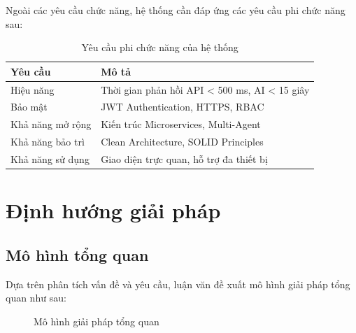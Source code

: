 \documentclass[12pt,a4paper]{report}
\begin{document}
Ngoài các yêu cầu chức năng, hệ thống cần đáp ứng các yêu cầu phi chức năng sau:

\begin{table}[H]
\centering
\caption{Yêu cầu phi chức năng của hệ thống}
\begin{tabular}{|p{5cm}|p{8cm}|}
\hline
\textbf{Yêu cầu} & \textbf{Mô tả} \\
\hline
Hiệu năng & Thời gian phản hồi API < 500 ms, AI < 15 giây \\
\hline
Bảo mật & JWT Authentication, HTTPS, RBAC \\
\hline
Khả năng mở rộng & Kiến trúc Microservices, Multi-Agent \\
\hline
Khả năng bảo trì & Clean Architecture, SOLID Principles \\
\hline
Khả năng sử dụng & Giao diện trực quan, hỗ trợ đa thiết bị \\
\hline
\end{tabular}
\label{tab:non_functional_requirements}
\end{table}

\section{Định hướng giải pháp}

\subsection{Mô hình tổng quan}

Dựa trên phân tích vấn đề và yêu cầu, luận văn đề xuất mô hình giải pháp tổng quan như sau:

\begin{figure}[H]
\centering
{}
\caption{Mô hình giải pháp tổng quan}
\label{fig:solution_overview}
\end{figure}
\end{document}
